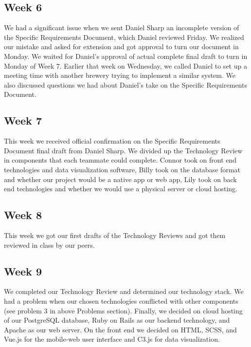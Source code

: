 \documentclass[draftclsnofoot,onecolumn,letterpaper,10pt,compsoc]{IEEEtran}
\begin{document}
\subsection{Week 6}
We had a significant issue when we sent Daniel Sharp an incomplete version of the Specific Requirements Document, which Daniel reviewed Friday.
We realized our mistake and asked for extension and got approval to turn our document in Monday.
We waited for Daniel’s approval of actual complete final draft to turn in Monday of Week 7.
Earlier that week on Wednesday, we called Daniel to set up a meeting time with another brewery trying to implement a similar system.
We also discussed questions we had about Daniel’s take on the Specific Requirements Document.

\subsection{Week 7}
This week we received official confirmation on the Specific Requirements Document final draft from Daniel Sharp.
We divided up the Technology Review in components that each teammate could complete.
Connor took on front end technologies and data visualization software, Billy took on the database format and whether our project would be a native app or web app, Lily took on back end technologies and whether we would use a physical server or cloud hosting.

\subsection{Week 8}
This week we got our first drafts of the Technology Reviews and got them reviewed in class by our peers.

\subsection{Week 9}
We completed our Technology Review and determined our technology stack.
We had a problem when our chosen technologies conflicted with other components (see problem 3 in above Problems section).
Finally, we decided on cloud hosting of our PostgreSQL database, Ruby on Rails as our backend technology, and Apache as our web server.
On the front end we decided on HTML, SCSS, and Vue.js for the mobile-web user interface and C3.js for data visualization.
\end{document}

